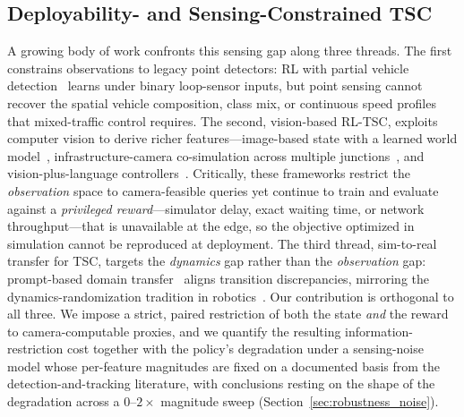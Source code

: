 \subsection{Deployability- and Sensing-Constrained TSC}
A growing body of work confronts this sensing gap along three threads.
The first constrains observations to legacy point detectors: RL with partial vehicle
detection~\cite{zhang2021_partialdetection} learns under binary loop-sensor
inputs, but point sensing cannot recover the spatial vehicle composition, class
mix, or continuous speed profiles that mixed-traffic control requires. The
second, vision-based RL-TSC, exploits computer vision to derive richer
features---image-based state with a learned world model~\cite{dai2022_worldmodels},
infrastructure-camera co-simulation across multiple junctions~\cite{azfar2025_cosim},
and vision-plus-language controllers~\cite{su2025_visionllm}. Critically, these
frameworks restrict the \emph{observation} space to camera-feasible queries yet
continue to train and evaluate against a \emph{privileged reward}---simulator
delay, exact waiting time, or network throughput---that is unavailable at the
edge, so the objective optimized in simulation cannot be reproduced at
deployment. The third thread, sim-to-real transfer for TSC, targets the
\emph{dynamics} gap rather than the \emph{observation} gap: prompt-based domain
transfer~\cite{da2024_promptgat} aligns transition discrepancies, mirroring the
dynamics-randomization tradition in robotics~\cite{peng2018_dynrand,zhao2020_sim2real_survey}.
Our contribution is orthogonal to all three. We impose a strict, paired
restriction of both the state \emph{and} the reward to camera-computable
proxies, and we quantify the resulting information-restriction cost together
with the policy's degradation under a sensing-noise model whose per-feature
magnitudes are fixed on a documented basis from the detection-and-tracking
literature, with conclusions resting on the shape of the degradation across a
$0$--$2\times$ magnitude sweep (Section~\ref{sec:robustness_noise}).

